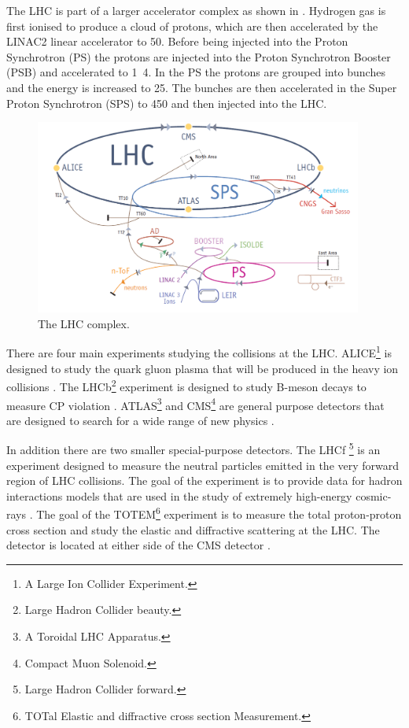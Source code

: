 The LHC is part of a larger accelerator complex as shown in 
. Hydrogen gas is first ionised to produce a cloud of
protons, which are then accelerated by the LINAC2 linear accelerator to
\unit{50}{\MeV}.  Before being injected into the Proton Synchrotron (PS) the
protons are injected into the Proton Synchrotron Booster (PSB) and accelerated
to \unit{1.4}{\GeV}. In the PS the protons are grouped into bunches and the
energy is increased to \unit{25}{\GeV}. The bunches are then accelerated in the
Super Proton Synchrotron (SPS) to \unit{450}{\GeV} and then injected into the
LHC.

\begin{figure}[htbp]
  \centering
  \includegraphics[width=0.96\textwidth]{accelerators.png}
  \caption{The LHC complex.}
  \label{fig:LHCcomplex}
\end{figure}

There are four main experiments studying the collisions at the
{LHC}.  
ALICE\footnote{A Large Ion Collider Experiment.} is designed to study the quark
gluon plasma that will be produced in the heavy ion collisions
\cite{aamodt2008alice}.
The LHCb\footnote{Large Hadron Collider beauty.} experiment is designed to study
B-meson decays to measure CP violation \cite{alves2008lhcb}.
ATLAS\footnote{A Toroidal LHC Apparatus.} and CMS\footnote{Compact Muon
Solenoid.} are general purpose detectors that are designed to search for a wide
range of new physics \cite{chatrchyan2008cms,aad2008atlas}.

In addition there are two smaller special-purpose detectors.
The LHCf \footnote{Large Hadron Collider forward.} is an experiment designed to
measure the neutral particles emitted in the very forward region of LHC
collisions.  The goal of the experiment is to provide data for hadron
interactions models that are used in the study of extremely high-energy
cosmic-rays \cite{adriani2008lhcf}.
The goal of the TOTEM\footnote{TOTal Elastic and diffractive cross section
Measurement.} experiment is to measure the total proton-proton
cross section and study the elastic and diffractive scattering at the LHC. The
detector is located at either side of the CMS detector \cite{anelli2008totem}.

